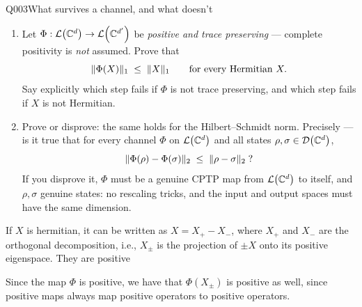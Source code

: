 \begin{entry}{Q003}{What survives a channel, and what doesn't}


\begin{problem}

\begin{enumerate}[label=\textbf{(\alph*)},leftmargin=*]

\item Let $\Phi:\mathcal{L}\!\left(\mathbb{C}^{d}\right)\to\mathcal{L}\!\left(\mathbb{C}^{d'}\right)$ be \emph{positive and trace preserving}
      --- complete positivity is \emph{not} assumed. Prove that
      \[
        \lVert\Phi(X)\rVert_{1}\;\le\;\lVert X\rVert_{1}
        \qquad\text{for every Hermitian }X .
      \]
      Say explicitly which step fails if $\Phi$ is not trace preserving, and which step
      fails if $X$ is not Hermitian.

\item Prove or disprove: the same holds for the Hilbert--Schmidt norm. Precisely --- is it
      true that for every channel $\Phi$ on $\mathcal{L}\!\left(\mathbb{C}^{d}\right)$ and all states
      $\rho,\sigma\in\mathcal{D}\!\left(\mathbb{C}^{d}\right)$,
      \[
        \lVert\Phi(\rho)-\Phi(\sigma)\rVert_{2}\;\le\;\lVert\rho-\sigma\rVert_{2}\;?
      \]
      If you disprove it, $\Phi$ must be a genuine CPTP map from $\mathcal{L}\!\left(\mathbb{C}^{d}\right)$ to itself,
      and $\rho,\sigma$ genuine states: no rescaling tricks, and the input and output spaces
      must have the same dimension.

\end{enumerate}
\end{problem}

\begin{solution}[Part (a)]
If $X$ is hermitian, it can be written as $X= X_+ - X_-$, where $X_+$ and $X_-$ are the orthogonal decomposition, i.e., $X_{\pm}$ is the projection of $\pm X$ onto its positive eigenspace. They are positive  

Since the map $\Phi$ is positive, we have that $\Phi(X_{\pm})$ is positive as well, since positive maps always map positive operators to positive operators. 


\end{solution}
\end{entry}
